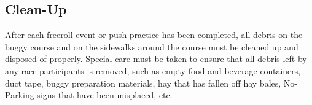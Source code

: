 \subsection{Clean-Up}
\label{ssec:CleanUp}
	After each freeroll event or push practice has been completed, all debris on the buggy course and on the sidewalks around the course must be cleaned up and disposed of properly. Special care must be taken to ensure that all debris left by any race participants is removed, such as empty food and beverage containers, duct tape, buggy preparation materials, hay that has fallen off hay bales, No-Parking signs that have been misplaced, etc.
